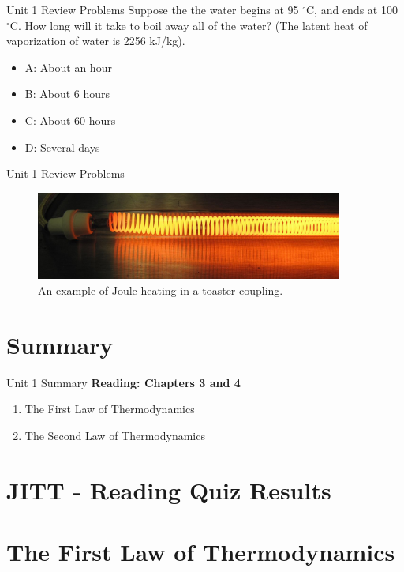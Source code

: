 \documentclass{beamer}
\begin{document}
\begin{frame}{Unit 1 Review Problems}
Suppose the the water begins at 95 $^{\circ}$C, and ends at 100 $^{\circ}$C.  How long will it take to boil away all of the water?  (The latent heat of vaporization of water is 2256 kJ/kg).
\begin{itemize}
\item A: About an hour
\item B: About 6 hours
\item C: About 60 hours
\item D: Several days
\end{itemize}
\end{frame}

\begin{frame}{Unit 1 Review Problems}
\begin{figure}
\centering
\includegraphics[width=0.9\textwidth]{figures/toaster.JPG}
\caption{\label{fig:toast} An example of Joule heating in a toaster coupling.}
\end{figure}
\end{frame}

\section{Summary}

\begin{frame}{Unit 1 Summary}
\textbf{Reading: Chapters 3 and 4}
\begin{enumerate}
\item The First Law of Thermodynamics
\item The Second Law of Thermodynamics
\end{enumerate}
\end{frame}

\section{JITT - Reading Quiz Results}

\section{The First Law of Thermodynamics}
\end{document}
